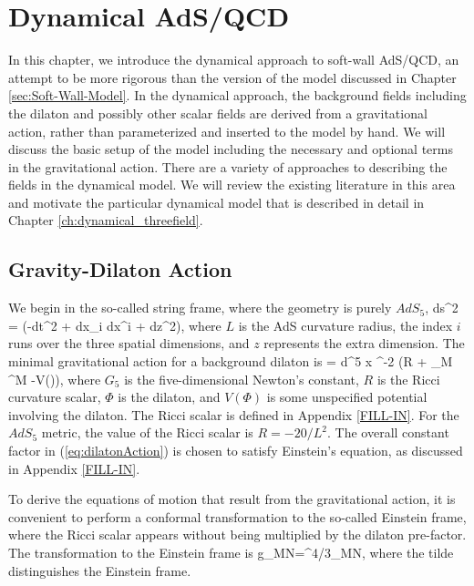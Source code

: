 \chapter{Dynamical AdS/QCD}
\label{ch:dynamical}

In this chapter, we introduce the dynamical approach to soft-wall AdS/QCD, an attempt to be more rigorous than the version of the model discussed in Chapter \ref{sec:Soft-Wall-Model}.
In the dynamical approach, the background fields including the dilaton and possibly other scalar fields are derived from a gravitational action, rather than parameterized and inserted to the model by hand.
We will discuss the basic setup of the model including the necessary and optional terms in the gravitational action.
There are a variety of approaches to describing the fields in the dynamical model.
We will review the existing literature in this area and motivate the particular dynamical model that is described in detail in Chapter \ref{ch:dynamical_threefield}.

\section{Gravity-Dilaton Action}
\label{sec:gravity-dilaton}

We begin in the so-called string frame, where the geometry is purely $AdS_5$, 
\be
ds^2 = (-dt^2 + dx_i dx^i + dz^2),
\label{eq:AdSmetricdynamical}
\ee
where $L$ is the AdS curvature radius, the index $i$ runs over the three spatial dimensions, and $z$ represents the extra dimension.
The minimal gravitational action for a background dilaton is
\be
{} = \int d^5 x \root \EXP^{-2\Phi} \left(R + \partial_M \Phi \partial^M \Phi -V(\Phi)\right),
\label{eq:dilatonAction}
\ee
where $G_5$ is the five-dimensional Newton's constant, $R$ is the Ricci curvature scalar, $\Phi$ is the dilaton, and $V(\Phi)$ is some unspecified potential involving the dilaton.
The Ricci scalar is defined in Appendix \ref{FILL-IN}. 
For the $AdS_5$ metric, the value of the Ricci scalar is $R=-20/L^2$.
The overall constant factor in (\ref{eq:dilatonAction}) is chosen to satisfy Einstein's equation, as discussed in Appendix \ref{FILL-IN}.

To derive the equations of motion that result from the gravitational action, it is convenient to perform a conformal transformation to the so-called Einstein frame, where the Ricci scalar appears without being multiplied by the dilaton pre-factor.
The transformation to the Einstein frame is
\be
g_{MN}=\EXP^{4\Phi/3}_{MN},
\label{eq:transform}
\ee
where the tilde distinguishes the Einstein frame. 

